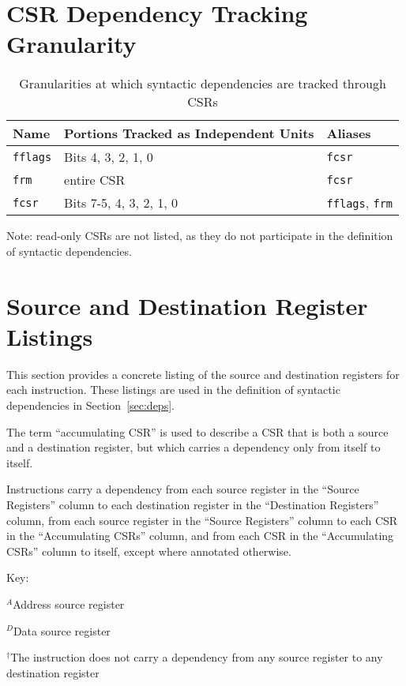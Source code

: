 \section{CSR Dependency Tracking Granularity}
\label{sec:csr-granularity}

\begin{table}[h!]
  \centering
  \begin{tabular}{|l|l|l|}
    \hline
    Name & Portions Tracked as Independent Units & Aliases  \\
    \hline
    {\tt fflags} & Bits 4, 3, 2, 1, 0 & {\tt fcsr}  \\
    \hline
    {\tt frm} & entire CSR & {\tt fcsr} \\
    \hline
    {\tt fcsr} & Bits 7-5, 4, 3, 2, 1, 0 & {\tt fflags}, {\tt frm} \\
    \hline
  \end{tabular}
  \caption{Granularities at which syntactic dependencies are tracked through CSRs}
\end{table}

Note: read-only CSRs are not listed, as they do not participate in the definition of syntactic dependencies.

\section{Source and Destination Register Listings}
\label{sec:source-dest-regs}

This section provides a concrete listing of the source and destination registers for each instruction.
These listings are used in the definition of syntactic dependencies in Section~\ref{sec:deps}.

The term ``accumulating CSR'' is used to describe a CSR that is both a source and a destination register, but which carries a dependency only from itself to itself.

Instructions carry a dependency from each source register in the ``Source Registers'' column to each destination register in the ``Destination Registers'' column, from each source register in the ``Source Registers'' column to each CSR in the ``Accumulating CSRs'' column, and from each CSR in the ``Accumulating CSRs'' column to itself, except where annotated otherwise.

Key:

$^A$Address source register

$^D$Data source register

$^\dagger$The instruction does not carry a dependency from any source register to any destination register

